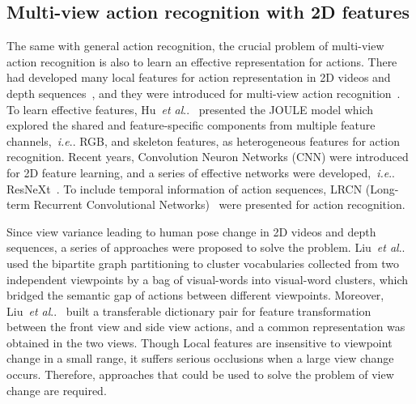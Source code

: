 \documentclass[journal]{IEEEtran}
\makeatletter
\DeclareRobustCommand\onedot{\futurelet\@let@token\@onedot}
\def\@onedot{\ifx\@let@token.\else.\null\fi\xspace}
\def\ie{\emph{i.e}\onedot} \def\Ie{\emph{I.e}\onedot}
\def\etal{\emph{et al}\onedot}
\makeatother
\begin{document}
\subsection{Multi-view action recognition with 2D features}
The same with general action recognition, the crucial problem of multi-view action recognition is also to learn an effective representation for actions. There had developed many local features for action representation in 2D videos and depth sequences~\cite{TPAMIfcvid,TIP2015Action,hu2017robust}, and they were introduced for multi-view action recognition~\cite{Yan4D2012,2DMulti2014,TIP2016FineG}. To learn effective features, Hu~\etal~\cite{JOULE2016} presented the JOULE model which explored the shared and feature-specific components from multiple feature channels,~\ie RGB, and skeleton features, as heterogeneous features for action recognition. Recent years, Convolution Neuron Networks (CNN) were introduced for 2D feature learning, and a series of effective networks were developed,~\ie ResNeXt~\cite{ResNeXtARX2018}. To include temporal information of action sequences, LRCN (Long-term Recurrent Convolutional Networks)~\cite{LRCNCVPR2015} were presented for action recognition.

Since view variance leading to human pose change in 2D videos and depth sequences, a series of approaches were proposed to solve the problem. Liu~\etal~\cite{LiuTransfer2011} used the bipartite graph partitioning to cluster vocabularies collected from two independent viewpoints by a bag of visual-words into visual-word clusters, which bridged the semantic gap of actions between different viewpoints. Moreover, Liu~\etal~\cite{M2Ibenchmark2016} built a transferable dictionary pair for feature transformation between the front view and side view actions, and a common representation was obtained in the two views. Though Local features are insensitive to viewpoint change in a small range, it suffers serious occlusions when a large view change occurs. Therefore, approaches that could be used to solve the problem of view change are required.
\end{document}
